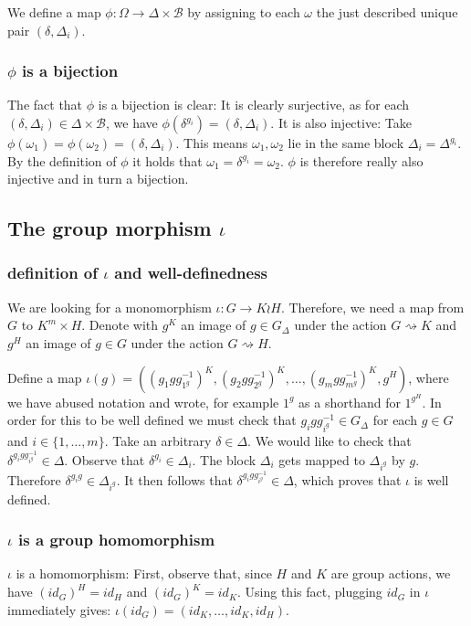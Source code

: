 \documentclass{article}
\begin{document}
\noindent We define a map $\phi : \Omega \to \Delta \times \mathcal{B}$ by assigning to each $\omega$ the just described unique pair $(\delta, \Delta_i)$.
\subsubsection*{$\phi$ is a bijection}
The fact that $\phi$ is a bijection is clear: It is clearly surjective, as for each $(\delta, \Delta_i) \in \Delta \times \mathcal{B}$, we have $\phi(\delta^{g_i}) = (\delta, \Delta_i)$.
It is also injective: Take $\phi(\omega_1) = \phi(\omega_2) = (\delta, \Delta_i)$. This means $\omega_1, \omega_2$ lie in the same block $\Delta_i = \Delta^{g_i}$. By the definition of $\phi$ it holds that $\omega_1 = \delta^{g_i} = \omega_2$. $\phi$ is therefore really also injective and in turn a bijection.  
\subsection*{The group morphism $\iota$}
\subsubsection*{definition of $\iota$ and well-definedness}
We are looking for a monomorphism $\iota : G \to K \wr H$. Therefore, we need a map from $G$ to $K^m \times H$.
Denote with $g^K$ an image of $g \in G_\Delta$ under the action $G \rightsquigarrow K$ and $g^H$ an image of $g \in G$ under the action $G \rightsquigarrow H$.

Define a map $\iota(g) = ((g_1 g g_{1^{g}}^{-1})^K, (g_2 g g_{2^g}^{-1})^K, \dots, (g_m g g_{m^g}^{-1})^K,  g^H)$, where we have abused notation and wrote, for example $1^g$ as a shorthand for $1^{g^H}$. In order for this to be well defined we must check that $g_i g g_{i^g}^{-1} \in G_\Delta$ for each $g \in G$ and $i \in \{1,\dots,m\}$.
Take an arbitrary $\delta \in \Delta$. We would like to check that $\delta^{g_i g g_{i^g}^{-1}} \in \Delta$. Observe that $\delta^{g_i} \in \Delta_i$. The block $\Delta_i$ gets mapped to $\Delta_{i^g}$ by $g$. Therefore $\delta^{g_i g} \in \Delta_{i^g}$. It then follows that $\delta^{g_i g g_{i^g}^{-1}} \in \Delta$, which proves that $\iota$ is well defined.

\subsubsection*{$\iota$ is a group homomorphism}
$\iota$ is a homomorphism: First, observe that, since $H$ and $K$ are group actions, we have $(id_G)^H = id_H$ and $(id_G)^K = id_K$. Using this fact, plugging $id_G$ in $\iota$ immediately gives: $\iota(id_G) = (id_K, \dots, id_K, id_H)$.
\end{document}
